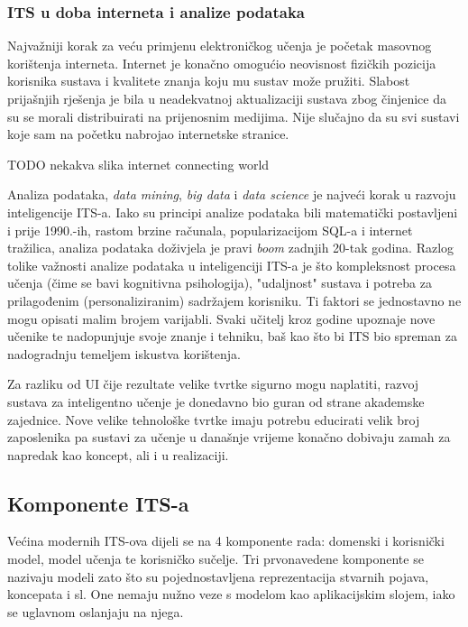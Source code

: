 \documentclass[times, utf8, zavrsni]{fer}
\begin{document}
\subsubsection{ITS u doba interneta i analize podataka}
Najvažniji korak za veću primjenu elektroničkog učenja je početak masovnog korištenja interneta. Internet je konačno omogućio neovisnost fizičkih pozicija korisnika sustava i kvalitete znanja koju mu sustav može pružiti. Slabost prijašnjih rješenja je bila u neadekvatnoj aktualizaciji sustava zbog činjenice da su se morali distribuirati na prijenosnim medijima. Nije slučajno da su svi sustavi koje sam na početku nabrojao internetske stranice.
\par  TODO nekakva slika internet connecting world
\par
Analiza podataka, \textit{data mining}, \textit{big data} i \textit{data science} je najveći korak u razvoju inteligencije ITS-a. Iako su principi analize podataka bili matematički postavljeni i prije 1990.-ih, rastom brzine računala, popularizacijom SQL-a i internet tražilica, analiza podataka doživjela je pravi \textit{boom} zadnjih 20-tak godina. Razlog tolike važnosti analize podataka u inteligenciji ITS-a je što kompleksnost procesa učenja (čime se bavi kognitivna psihologija), "udaljnost" sustava i potreba za prilagođenim (personaliziranim) sadržajem korisniku. Ti faktori se jednostavno ne mogu opisati malim brojem varijabli. Svaki učitelj kroz godine upoznaje nove učenike te nadopunjuje svoje znanje i tehniku, baš kao što bi ITS bio spreman za nadogradnju temeljem iskustva korištenja.
\par
Za razliku od UI čije rezultate velike tvrtke sigurno mogu naplatiti, razvoj sustava za inteligentno učenje je donedavno bio guran od strane akademske zajednice. Nove velike tehnološke tvrtke imaju potrebu educirati velik broj zaposlenika pa sustavi za učenje u današnje vrijeme konačno dobivaju zamah za napredak kao koncept, ali i u realizaciji.

\subsection{Komponente ITS-a}
Većina modernih ITS-ova dijeli se na 4 komponente rada: domenski i korisnički model, model učenja te korisničko sučelje. Tri prvonavedene komponente se nazivaju modeli zato što su pojednostavljena reprezentacija stvarnih pojava, koncepata i sl. One nemaju nužno veze s modelom kao aplikacijskim slojem, iako se uglavnom oslanjaju na njega.
\end{document}
